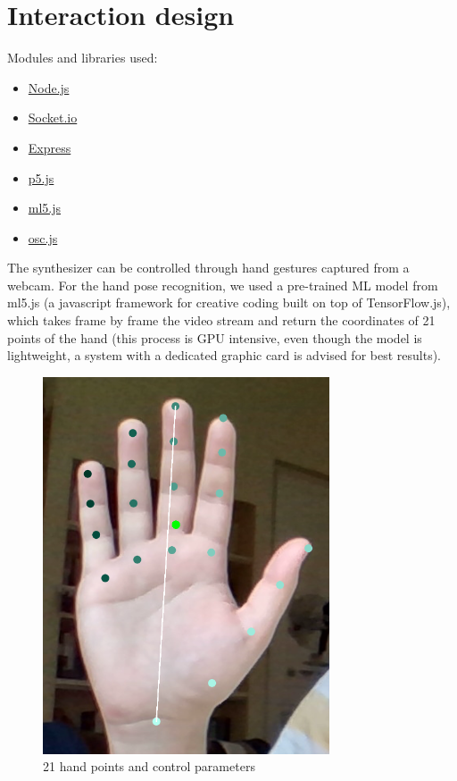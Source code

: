 \documentclass[a4paper,12pt]{report}
\begin{document}
\section*{Interaction design}

Modules and libraries used:
\begin{itemize}
	\item \href{https://nodejs.org/en/}{ Node.js }
	\item \href{https://socket.io/}{ Socket.io }
	\item \href{https://expressjs.com/}{ Express }
	\item \href{https://p5js.org/}{ p5.js }
	\item\href{https://ml5js.org/}{ ml5.js }
	\item \href{https://github.com/colinbdclark/osc.js/}{ osc.js }
\end{itemize}

The synthesizer can be controlled through hand gestures captured from a webcam. For the hand pose recognition, we used a pre-trained ML model from ml5.js (a javascript framework for creative coding built on top of TensorFlow.js), which takes frame by frame the video stream and return the coordinates of 21 points of the hand (this process is GPU intensive, even though the model is lightweight, a system with a dedicated graphic card is advised for best results). 

\begin{figure}[h]
\centering
\includegraphics[scale=0.8]{hand.png}
\caption{21 hand points and control parameters}
\end{figure}
\end{document}

